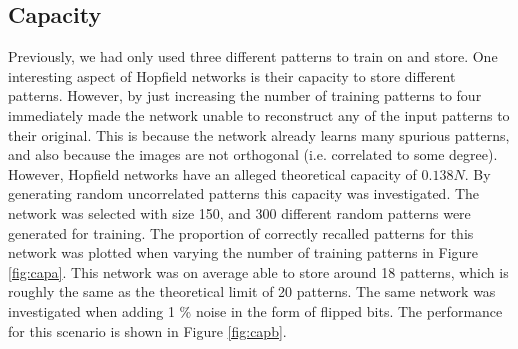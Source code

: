 \documentclass[a4paper]{article}
\begin{document}
\subsection{Capacity}
Previously, we had only used three different patterns to train on and store. One interesting aspect of Hopfield networks is their capacity to store different patterns. However, by just increasing the number of training patterns to four immediately made the network unable to reconstruct any of the input patterns to their original. This is because the network already learns many spurious patterns, and also because the images are not orthogonal (i.e. correlated to some degree).
However, Hopfield networks have an alleged theoretical capacity of $0.138N$. By generating random uncorrelated patterns this capacity was investigated. The network was selected with size 150, and 300 different random patterns were generated for training. 
The proportion of correctly recalled patterns for this network was plotted when varying the number of training patterns in Figure \ref{fig:capa}. This network was on average able to store around 18 patterns, which is roughly the same as the theoretical limit of 20 patterns. The same network was investigated when adding 1 \% noise in the form of flipped bits. The performance for this scenario is shown in Figure \ref{fig:capb}.
\end{document}
